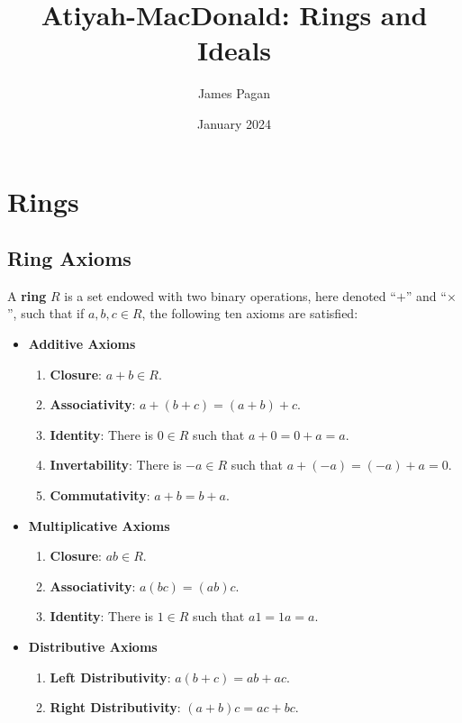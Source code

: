 \documentclass[11pt]{article}
\title{Atiyah-MacDonald: Rings and Ideals}
\author{James Pagan}
\date{January 2024}
\begin{document}
\maketitle
\tableofcontents
\newpage


\section{Rings}


\subsection{Ring Axioms}

A \textbf{ring} $R$ is a set endowed with two binary operations, here denoted ``$+$'' and ``$\times$'', such that if $a, b, c \in R$, the following ten axioms are satisfied:

\begin{itemize}
	\item \textbf{Additive Axioms}
	\begin{enumerate}
		\item \textbf{Closure}: $a + b \in R$.
		\item \textbf{Associativity}: $a + (b + c) = (a + b) + c$.
		\item \textbf{Identity}: There is $0 \in R$ such that $a + 0 = 0 + a = a$.
		\item \textbf{Invertability}: There is $-a \in R$ such that $a + (-a) = (-a) + a = 0$.
		\item \textbf{Commutativity}: $a + b = b + a$.
	\end{enumerate}
	\item \textbf{Multiplicative Axioms}
	\begin{enumerate}\addtocounter{enumi}{5}
		\item \textbf{Closure}: $ab \in R$.
		\item \textbf{Associativity}: $a(bc) = (ab)c$.
		\item \textbf{Identity}: There is $1 \in R$ such that $a1 = 1a = a$.
	\end{enumerate}
	\item \textbf{Distributive Axioms}
	\begin{enumerate}\addtocounter{enumi}{8}
		\item \textbf{Left Distributivity}: $a(b + c) = ab + ac$.
		\item \textbf{Right Distributivity}: $(a + b)c = ac + bc$.
	\end{enumerate}
\end{itemize}
\end{document}
